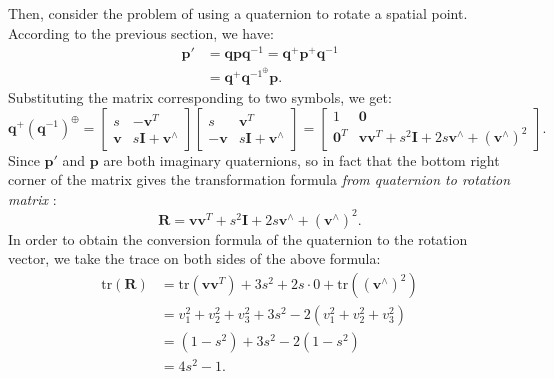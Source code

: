 Then, consider the problem of using a quaternion to rotate a spatial point. According to the previous section, we have:
\begin{equation}
	\begin{split}
		\mathbf{p}' &= \mathbf{q} \mathbf{p} \mathbf{q}^{-1} = \mathbf{q}^+ \mathbf{p}^+ \mathbf{q}^{ -1} \\
		&= \mathbf{q}^+ \mathbf{q}^{{-1}^{\oplus}} \mathbf{p}.
	\end{split}
\end{equation}
Substituting the matrix corresponding to two symbols, we get:
\begin{equation}\label{eq:quaternion-to-rotation-matrix-derive}
	{\mathbf{q}^ + }{\left( {{\mathbf{q}^{ - 1}}} \right)^ \oplus } = \left[ \begin{array}{*{20}{c }}
		s&-\mathbf{v}^T\\
		\mathbf{v}&s\mathbf{I}+\mathbf{v}^\wedge
	\end{array} \right]\left[\begin{array}{*{20}{c}}
		s&{\mathbf{v} ^T}\\
		{ - \mathbf{v} }&{s\mathbf{I} + \mathbf{v} ^ \wedge }
	\end{array} \right] = \left[ \begin{array}{*{20}{c}}
		1&\mathbf{0} \\
		\mathbf{0}^T&\mathbf{v}\mathbf{v}^T + {s^2} \mathbf{I} + 2s\mathbf{v} ^ \wedge + {(\mathbf{v} ^ \wedge)}^2
	\end{array} \right].
\end{equation}
Since $\mathbf{p}'$ and $\mathbf{p}$ are both imaginary quaternions, so in fact that the bottom right corner of the matrix gives the transformation formula \textit{from quaternion to rotation matrix} :
\begin{equation}
	\mathbf{R} = \mathbf{v} \mathbf{v}^T + {s^2} \mathbf{I} + 2s\mathbf{v} ^ \wedge + {(\mathbf{v } ^ \wedge)}^2.
\end{equation}
In order to obtain the conversion formula of the quaternion to the rotation vector, we take the trace on both sides of the above formula:
\begin{equation}
	\begin{aligned}
		\mathrm{tr}(\mathbf{R}) &= \mathrm{tr}(\mathbf{v}\mathbf{v}^T) + 3s^2 + 2s \cdot 0 + \mathrm{tr }((\mathbf{v}^\wedge)^2) \\
		&= v_1^2+v_2^2+v_3^2 + 3s^2 - 2(v_1^2+v_2^2+v_3^2) \\
		&= (1-s^2) + 3s^2 -2(1-s^2)\\
		&= 4s^2 -1.
	\end{aligned}
\end{equation}
